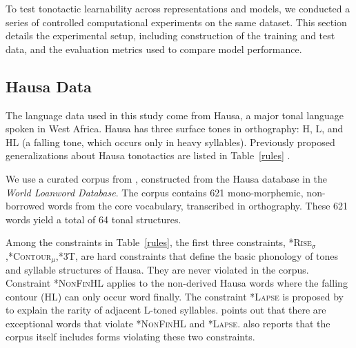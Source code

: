 \documentclass[11pt]{article}
\begin{document}
To test tonotactic learnability across representations and models,
we conducted a series of controlled computational experiments on the same
dataset.
This section details the experimental setup,
including construction of the training and test data, and
the evaluation metrics used to compare model performance.

\subsection{Hausa Data}

The language data used in this study come from Hausa, a major tonal
language spoken in West Africa.
Hausa has three surface tones in orthography: H, L,
and HL (a falling tone, which occurs only in heavy syllables).
Previously proposed generalizations about Hausa tonotactics are listed
in Table~\ref{rules} \citep{Newmanbook,leben1996tonal,zoll2003optimal}.



We use a curated corpus from \citet{li2025learning},
constructed from the Hausa database \citep{wold-4}
in the \textit{World Loanword Database}.
The corpus contains 621 mono-morphemic, non-borrowed words from the
core vocabulary, transcribed in orthography.
These 621 words yield a total of 64 tonal structures.

Among the constraints in Table~\ref{rules}, the first three constraints,
\textsc{*Rise$_\sigma$},\textsc{*Contour$_{\mu}$},\textsc{*3T}, are hard
constraints that define the basic phonology of tones and syllable 
structures of Hausa.
They are never violated in the corpus.
Constraint \textsc{*NonFinHL} applies to the non-derived Hausa words
where the falling contour (HL) can only occur word finally.
The constraint \textsc{*Lapse} is proposed by \citet{zoll2003optimal}
to explain the rarity of adjacent L-toned syllables.
\citet{Newmanbook} points out that there are exceptional words that
violate \textsc{*NonFinHL} and \textsc{*Lapse}.
\citet{li2025learning} also reports that the corpus itself
includes forms violating these two constraints.

\end{document}
